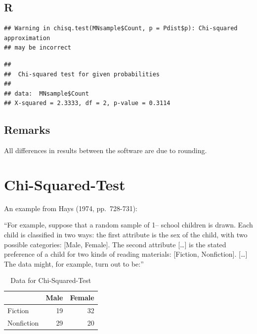 \documentclass[
]{book}
\newenvironment{Shaded}{\begin{snugshade}}{\end{snugshade}}
\newcommand{\DataTypeTok}[1]{\textcolor[rgb]{0.13,0.29,0.53}{#1}}
\newcommand{\KeywordTok}[1]{\textcolor[rgb]{0.13,0.29,0.53}{\textbf{#1}}}
\newcommand{\NormalTok}[1]{#1}
\newcommand{\OperatorTok}[1]{\textcolor[rgb]{0.81,0.36,0.00}{\textbf{#1}}}
\begin{document}
\hypertarget{r-1}{%
\subsection{R}\label{r-1}}

\begin{Shaded}
\end{Shaded}

\begin{verbatim}
## Warning in chisq.test(MNsample$Count, p = Pdist$p): Chi-squared approximation
## may be incorrect
\end{verbatim}

\begin{verbatim}
## 
## 	Chi-squared test for given probabilities
## 
## data:  MNsample$Count
## X-squared = 2.3333, df = 2, p-value = 0.3114
\end{verbatim}

\hypertarget{remarks-1}{%
\subsection{Remarks}\label{remarks-1}}

All differences in results between the software are due to rounding.

\hypertarget{chi-squared-test}{%
\section{Chi-Squared-Test}\label{chi-squared-test}}

An example from Hays (1974, pp.~728-731):

``For example, suppose that a random sample of 1-- school children is drawn. Each child is classified in two ways: the first attribute is the sex of the child, with two possible categories: {[}Male, Female{]}.
The second attribute {[}\ldots{]} is the stated preference of a child for two kinds of reading materials: {[}Fiction, Nonfiction{]}. {[}\ldots{]} The data might, for example, turn out to be:''

\begin{table}

\caption{\label{tab:unnamed-chunk-110}Data for Chi-Squared-Test}
\centering
\begin{tabular}[t]{lrr}
\toprule
  & Male & Female\\
\midrule
Fiction & 19 & 32\\
Nonfiction & 29 & 20\\
\bottomrule
\end{tabular}
\end{table}
\end{document}
